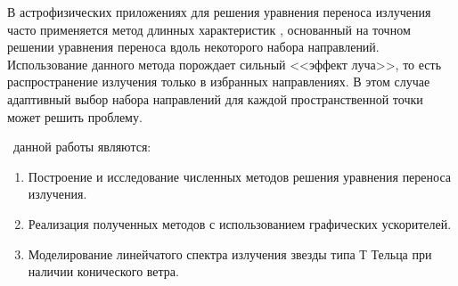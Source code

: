 В астрофизических приложениях для решения уравнения переноса излучения часто применяется метод длинных характеристик \cite{vladimirov1961}, основанный на точном решении уравнения переноса вдоль некоторого набора направлений. Использование данного метода порождает сильный <<эффект луча>>, то есть распространение излучения только в избранных направлениях. В этом случае адаптивный выбор набора направлений \cite{Galanin2010} для каждой пространственной точки может решить проблему. 

 \aim\ данной работы являются:
\begin{enumerate}
  \item Построение и исследование численных методов решения уравнения переноса излучения.
  \item Реализация полученных методов с использованием графических ускорителей.
  \item Моделирование линейчатого спектра излучения звезды типа Т Тельца при наличии конического ветра. 
\end{enumerate}

